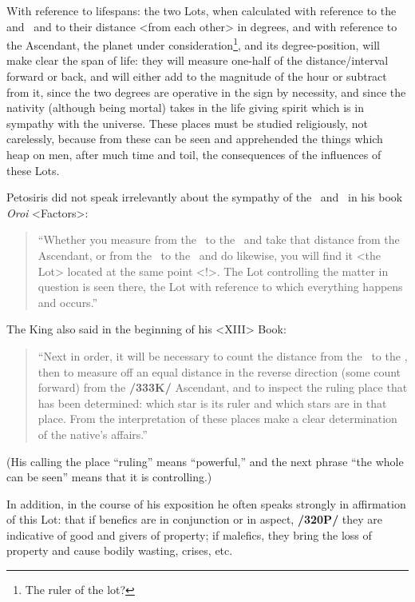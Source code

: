  
With reference to lifespans: the two Lots, when calculated with reference to the \Sun\, and \Moon\, and to their distance <from each other> in degrees, and with reference to the Ascendant, the planet under consideration\footnote{The ruler of the lot?}, and its degree-position, will make clear the span of life: they will measure one-half of the distance/interval forward or back, and will either add to the magnitude of the hour or subtract from it, since the two degrees are operative in the sign by necessity, and since the nativity (although being mortal) takes in the life giving spirit which is in sympathy with the universe. These places must be studied religiously, not carelessly, because from these can be seen and  apprehended the things which heap on men, after much time and toil, the consequences of the influences of these Lots. 

Petosiris did not speak irrelevantly about the sympathy of the \Sun\, and \Moon\, in his book \textit{Oroi} <Factors>: 
\begin{quote}
“Whether you measure from the \Sun\, to the \Moon\, and take that distance from the Ascendant, or from the \Moon\, to the \Sun\, and do likewise, you will find it <the Lot> located at the same point <!>. The Lot controlling the matter in question is seen there, the Lot with reference to which everything happens and occurs.” 
\end{quote}

The King also said in the beginning of his <XIII> Book: 
\begin{quote}
“Next in order, it will be necessary to count the distance from the \Sun\, to the \Moon, then to measure off an equal distance in the reverse direction (some count forward) from the \textbf{/333K/} Ascendant, and to inspect the ruling place that has been determined: which star is its ruler and which stars are in that place. From the interpretation of these places make a clear determination of the native’s affairs.”
\end{quote}

 (His calling the place “ruling” means “powerful,” and the next phrase “the whole can be seen” means that it is controlling.) 

In addition, in the course of his exposition he often speaks strongly in affirmation of this Lot: that if benefics are in conjunction or in aspect,
\textbf{/320P/} they are indicative of good and givers of property; if malefics, they bring the loss of property and cause bodily wasting, crises, etc.


